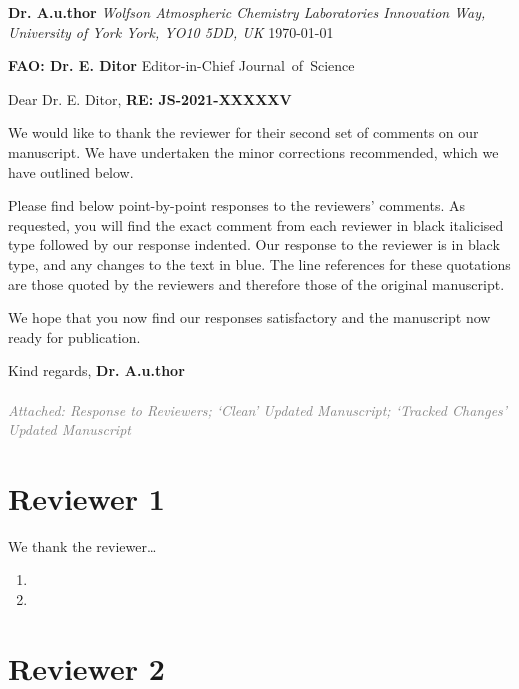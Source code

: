 \documentclass{article}
\newcommand{\addresseename}{Dr. E. Ditor}       %
\newcommand{\addresseetitle}{Editor-in-Chief}   %
\newcommand{\journal}{Journal~of~Science}       %
\newcommand{\paperid}{JS-2021-XXXXXV}           %
\newcommand{\letterwriter}{Dr. A.u.thor}        %
\newcommand{\attached}{Response to Reviewers; `Clean' Updated Manuscript; `Tracked Changes' Updated Manuscript} %
\newcommand{\quotecolor}{blue}                  %
\newcommand{\makereviewerhead}{
    \begin{flushright}
        \textbf{\letterwriter}\newline
        \emph{Wolfson Atmospheric Chemistry Laboratories\newline 
        Innovation Way, University of York\newline
        York, YO10 5DD, UK}\newline
        \bigskip
        \today
    \end{flushright}
    
    \begin{flushleft}
        \textbf{FAO: \addresseename}\newline
        \addresseetitle\newline
        \journal
    \end{flushleft}
    
    \bigskip
    \bigskip
    Dear \addresseename,\newline
    \bigskip
    \textbf{RE: \paperid}

}
\newcommand{\makereviewertail}{
    \bigskip\bigskip\RaggedRight
    \noindent Kind regards,\newline
    \bigskip
    \noindent\textbf{\letterwriter}\\~\\
    \small
    \noindent\textit{\textcolor{gray}{Attached: \attached}}
    \normalsize
}
\begin{document}
\makereviewerhead

\bigskip
We would like to thank the reviewer for their second set of comments on our manuscript. We have undertaken the minor corrections recommended, which we have outlined below.

\bigskip
\noindent Please find below point-by-point responses to the reviewers’ comments. As requested, you will find the exact comment from each reviewer in black italicised type followed by our response indented. Our response to the reviewer is in black type, and any changes to the text in \quotecolor. The line references for these quotations are those quoted by the reviewers and therefore those of the original manuscript. 

\bigskip
\noindent We hope that you now find our responses satisfactory and the manuscript now ready for publication.

\makereviewertail

\newpage


\section*{Reviewer 1}

We thank the reviewer\dots

\begin{enumerate}[label=1.\arabic*]

    \item {}
    
    \item {}
    
\end{enumerate}


\section*{Reviewer 2}
\end{document}
